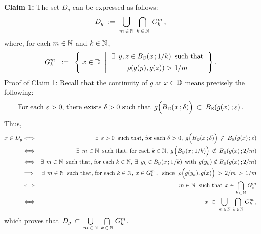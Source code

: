 \vskip 0.3cm
\noindent
\textbf{Claim 1:}\;\;
The set \;$D_{g}$\; can be expressed as follows:
\begin{equation*}
D_{g}
\; := \;
	\underset{m\,\in\,\mathbb{N}}{\bigcup}\;\,
	\underset{k\,\in\,\mathbb{N}}{\bigcap}\;\,
	G^{m}_{k}\,,
\end{equation*}
where, for each $m\in\mathbb{N}$ and $k\in\mathbb{N}$,
\begin{equation*}
G^{m}_{k}
\;\; := \;\;
	\left\{\;
		x\overset{{\color{white}.}}{\in}\D
		\;\,\left\vert\,
		\begin{array}{c}
			\exists \;\,y,z \in B_{\D}(x\,;1/k) \;\,\textnormal{such that}
			\\
			\rho(g(y),g(z)) \overset{{\color{white}-}}{>} 1/m
		\end{array}
		\right.
		\right\}.
\end{equation*}
Proof of Claim 1:\;\;
Recall that the continuity of $g$ at $x \in \mathbb{D}$ means precisely the following:
\begin{equation*}
\textnormal{For each $\varepsilon > 0$, there exists $\delta > 0$ such that
\,$g\!\left(\overset{{\color{white}.}}{B}_{\D}(x\,;\delta)\right)$ \,$\subset$\, $B_{\mathbb{E}}(g(x)\,;\varepsilon)$}\,.
\end{equation*}
Thus,
\begin{eqnarray*}
x \in D_{g}
&\Longleftrightarrow&
	\exists\;\,\varepsilon > 0 \;\;\textnormal{such that, for each $\delta > 0$},\;
	g\!\left(\overset{{\color{white}.}}{B}_{\D}(x\,;\delta)\right) \,\not\subset\, B_{\mathbb{E}}(g(x)\,;\varepsilon)
\\
&\Longleftrightarrow&
	\exists\;\,m \in \N \;\;\textnormal{such that, for each $k \in \N$},\;
	g\!\left(\overset{{\color{white}.}}{B}_{\D}(x\,;1/k)\right) \,\not\subset\, B_{\mathbb{E}}(g(x)\,;2/m)
\\
&\Longleftrightarrow&
	\exists\;\,m \in \N \;\;\textnormal{such that, for each $k \in \N$},\;
	\exists\;\, y_{k} \in B_{\D}(x\,;1/k)\;\,\textnormal{with}\;\, g(y_{k}) \notin B_{\mathbb{E}}(g(x)\,;2/m)
\\
&\Longrightarrow&
	\exists\;\,m \in \N \;\;\textnormal{such that, for each $k \in \N$},\;
	x \in G^{m}_{k}\,,
	\;\;\textnormal{since \;$\rho\!\left(g(y_{k})\overset{{\color{white}\vert}}{,}\,g(x)\right) \,>\, 2/m \,>\, 1/m$}
\\
&\Longleftrightarrow&
	\exists\;\,m \in \N \;\;\textnormal{such that}\;\, x \in \underset{k\,\in\,\N}{\bigcap}\; G^{m}_{k}
\\
&\Longleftrightarrow&
	x \;\in\; \underset{m\,\in\,\N}{\bigcup}\;\, \underset{k\,\in\,\N}{\bigcap}\; G^{m}_{k}\,,
\end{eqnarray*}
which proves that 
\,$D_{g} \,\subset\, \underset{m\,\in\,\mathbb{N}}{\bigcup}\;\, \underset{k\,\in\,\mathbb{N}}{\bigcap}\; G^{m}_{k}$.

